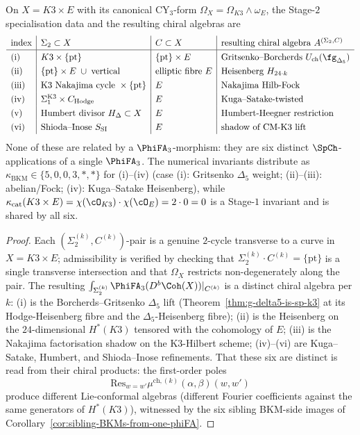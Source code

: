 \begin{proposition}
\label{wn:prop:agent3-six-specialisations}
\ClaimStatusProvedHere
On $X=K3\times E$ with its canonical CY$_3$-form $\Omega_X=\Omega_{K3}\wedge\omega_E$, the Stage-$2$ specialisation data and the resulting chiral algebras are
\[
\renewcommand{\arraystretch}{1.3}
\begin{array}{l|l|l|l}
 \text{index} & \Sigma_2\subset X & C\subset X &
 \text{resulting chiral algebra } A^{(\Sigma_2,C)} \\ \hline
 \text{(i)} & K3\times\{\mathrm{pt}\} & \{\mathrm{pt}\}\times E
 & \text{Gritsenko--Borcherds } U_{\mathrm{ch}}(\fg_{\Delta_5}) \\
 \text{(ii)} & \{\mathrm{pt}\}\times E\;\cup\;\text{vertical} & \text{elliptic fibre $E$}
 & \text{Heisenberg }H_{24\cdot k} \\
 \text{(iii)} & \text{K3 Nakajima cycle }\times\{\mathrm{pt}\} & E & \text{Nakajima Hilb-Fock} \\
 \text{(iv)} & \Sigma_1^{\text{K3}}\times C_{\text{Hodge}} & E & \text{Kuga--Satake-twisted} \\
 \text{(v)} & \text{Humbert divisor }H_\Delta\subset X & E & \text{Humbert-Heegner restriction} \\
 \text{(vi)} & \text{Shioda--Inose }S_{\mathrm{SI}} & E & \text{shadow of CM-K3 lift}
\end{array}
\]
None of these are related by a $\PhiFA_3$-morphism: they are six distinct $\SpCh$-applications of a single $\PhiFA_3$. The numerical invariants distribute as $\kappa_{\mathrm{BKM}}\in\{5,0,0,3,\ast,\ast\}$ for (i)--(iv) (case (i): Gritsenko $\Delta_5$ weight; (ii)--(iii): abelian/Fock; (iv): Kuga--Satake Heisenberg), while $\kappa_{\mathrm{cat}}(K3\times E)=\chi(\cO_{K3})\cdot\chi(\cO_E)=2\cdot 0=0$ is a Stage-$1$ invariant and is shared by all six.
\end{proposition}

\begin{proof}
Each $(\Sigma_2^{(k)},C^{(k)})$-pair is a genuine $2$-cycle transverse to a curve in $X=K3\times E$; admissibility is verified by checking that $\Sigma_2^{(k)}\cdot C^{(k)}=\{\mathrm{pt}\}$ is a single transverse intersection and that $\Omega_X$ restricts non-degenerately along the pair. The resulting $\int_{\Sigma_2^{(k)}}\PhiFA_3(D^b\Coh(X))|_{C^{(k)}}$ is a distinct chiral algebra per $k$: (i) is the Borcherds--Gritsenko $\Delta_5$ lift (Theorem~\ref{thm:g-delta5-is-sp-k3} at its Hodge-Heisenberg fibre and the $\Delta_5$-Heisenberg fibre); (ii) is the Heisenberg on the $24$-dimensional $H^*(K3)$ tensored with the cohomology of $E$; (iii) is the Nakajima factorisation shadow on the K3-Hilbert scheme; (iv)--(vi) are Kuga--Satake, Humbert, and Shioda--Inose refinements. That these six are distinct is read from their chiral products: the first-order poles
\[
 \mathrm{Res}_{w=w'}\mu^{\mathrm{ch},(k)}(\alpha,\beta)(w,w')
\]
produce different Lie-conformal algebras (different Fourier coefficients against the same generators of $H^*(K3)$), witnessed by the six sibling BKM-side images of Corollary~\ref{cor:sibling-BKMs-from-one-phiFA}.
\end{proof}

